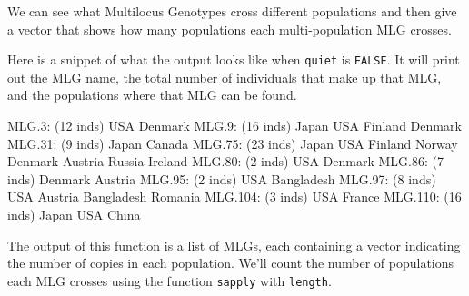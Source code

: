 \documentclass[letterpaper]{article}
\begin{document}
We can see what Multilocus Genotypes cross different populations and then give a vector that shows how many populations each multi-population MLG crosses.
\begin{Schunk}
\end{Schunk}
Here is a snippet of what the output looks like when \texttt{quiet} is \texttt{FALSE}. It will print out the MLG name, the total number of individuals that make up that MLG, and the populations where that MLG can be found.
\begin{Schunk}
\begin{Soutput}
MLG.3: (12 inds) USA Denmark 
MLG.9: (16 inds) Japan USA Finland Denmark 
MLG.31: (9 inds) Japan Canada 
MLG.75: (23 inds) Japan USA Finland Norway Denmark Austria Russia Ireland 
MLG.80: (2 inds) USA Denmark 
MLG.86: (7 inds) Denmark Austria 
MLG.95: (2 inds) USA Bangladesh 
MLG.97: (8 inds) USA Austria Bangladesh Romania 
MLG.104: (3 inds) USA France 
MLG.110: (16 inds) Japan USA China 
\end{Soutput}
\end{Schunk}
The output of this function is a list of MLGs, each containing a vector indicating the number of copies in each population. We'll count the number of populations each MLG crosses using the function \texttt{sapply} with \texttt{length}.
\end{document}
